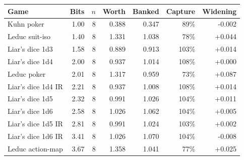 \begin{tabular}{l r r r r r r}
\toprule
Game & Bits & $n$ & Worth & Banked & Capture & Widening \\
\midrule
Kuhn poker & 1.00 & 8 & 0.388 & 0.347 & 89\% & -0.002 \\
Leduc suit-iso & 1.40 & 8 & 1.331 & 1.038 & 78\% & +0.044 \\
Liar's dice 1d3 & 1.58 & 8 & 0.889 & 0.913 & 103\% & +0.014 \\
Liar's dice 1d4 & 2.00 & 8 & 0.937 & 1.014 & 108\% & +0.000 \\
Leduc poker & 2.01 & 8 & 1.317 & 0.959 & 73\% & +0.087 \\
Liar's dice 1d4 IR & 2.21 & 8 & 0.937 & 1.008 & 108\% & +0.014 \\
Liar's dice 1d5 & 2.32 & 8 & 0.991 & 1.026 & 104\% & +0.011 \\
Liar's dice 1d6 & 2.58 & 8 & 1.026 & 1.062 & 104\% & +0.005 \\
Liar's dice 1d5 IR & 2.81 & 8 & 0.991 & 1.024 & 103\% & +0.002 \\
Liar's dice 1d6 IR & 3.41 & 8 & 1.026 & 1.070 & 104\% & -0.008 \\
Leduc action-map & 3.67 & 8 & 1.358 & 1.041 & 77\% & +0.025 \\
\bottomrule
\end{tabular}
